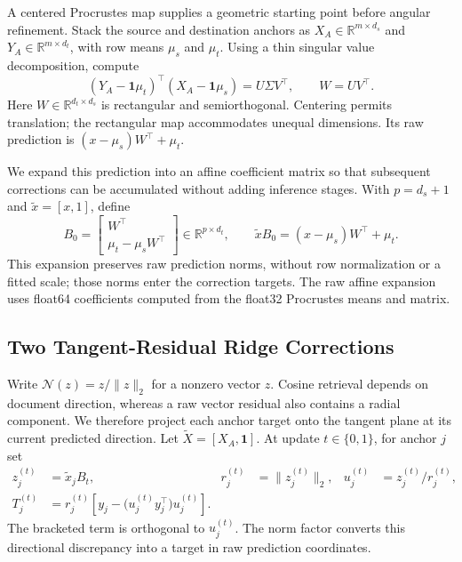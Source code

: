 A centered Procrustes map supplies a geometric starting point before angular
refinement. Stack the source and destination anchors as
$X_A\in\mathbb{R}^{m\times d_s}$ and
$Y_A\in\mathbb{R}^{m\times d_t}$, with row means $\mu_s$ and $\mu_t$.
Using a thin singular value decomposition, compute
\begin{equation}
 (Y_A-\mathbf{1}\mu_t)^\top(X_A-\mathbf{1}\mu_s)
 =U\Sigma V^\top,\qquad W=UV^\top .
 \label{eq:procrustes}
\end{equation}
Here $W\in\mathbb{R}^{d_t\times d_s}$ is rectangular and semiorthogonal.
Centering permits translation; the rectangular map accommodates unequal
dimensions. Its raw prediction is
$(x-\mu_s)W^\top+\mu_t$.

We expand this prediction into an affine coefficient matrix so that subsequent
corrections can be accumulated without adding inference stages. With
$p=d_s+1$ and $\widetilde{x}=[x,1]$, define
\begin{equation}
 B_0=\begin{bmatrix}W^\top\\ \mu_t-\mu_sW^\top\end{bmatrix}
 \in\mathbb{R}^{p\times d_t},\qquad
 \widetilde{x}B_0=(x-\mu_s)W^\top+\mu_t .
 \label{eq:affine-init}
\end{equation}
This expansion preserves raw prediction norms, without row normalization
or a fitted scale; those norms enter the correction targets.
The raw affine expansion uses float64 coefficients computed from the
float32 Procrustes means and matrix.

\subsection{Two Tangent-Residual Ridge Corrections}
\label{sec:tangent}

Write $\mathcal N(z)=z/\|z\|_2$ for a nonzero vector $z$.
Cosine retrieval depends on document direction, whereas a raw vector residual
also contains a radial component. We therefore project each anchor target
onto the tangent plane at its current predicted direction. Let
$\widetilde{X}=[X_A,\mathbf{1}]$. At update $t\in\{0,1\}$, for anchor $j$ set
\begin{align}
 z_j^{(t)}&=\widetilde{x}_jB_t,&
 r_j^{(t)}&=\|z_j^{(t)}\|_2,&
 u_j^{(t)}&=z_j^{(t)}/r_j^{(t)},\nonumber\\
 T_j^{(t)}&=r_j^{(t)}\left[y_j-
 \bigl(u_j^{(t)}y_j^\top\bigr)u_j^{(t)}\right].
 \label{eq:tangent-target}
\end{align}
The bracketed term is orthogonal to $u_j^{(t)}$. The norm factor converts this
directional discrepancy into a target in raw prediction coordinates.

